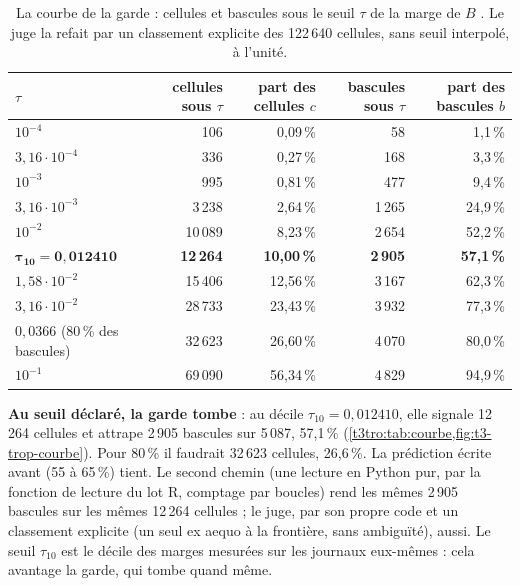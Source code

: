 \begin{table}[tbp]
\centering\small
\caption[La courbe de la garde]{La courbe de la garde : cellules et bascules sous le seuil $\tau$ de la marge de $B$ \mes. Le juge la refait par un classement explicite des 122\,640 cellules, sans seuil interpolé, à l'unité.}
\label{t3tro:tab:courbe}
\begin{tabular}{@{}lrrrr@{}}
\toprule
$\tau$ & cellules sous $\tau$ & part des cellules $c$ & bascules sous $\tau$ & part des bascules $b$ \\
\midrule
$10^{-4}$ & 106 & 0,09\,\% & 58 & 1,1\,\% \\
$3{,}16 \cdot 10^{-4}$ & 336 & 0,27\,\% & 168 & 3,3\,\% \\
$10^{-3}$ & 995 & 0,81\,\% & 477 & 9,4\,\% \\
$3{,}16 \cdot 10^{-3}$ & 3\,238 & 2,64\,\% & 1\,265 & 24,9\,\% \\
$10^{-2}$ & 10\,089 & 8,23\,\% & 2\,654 & 52,2\,\% \\
$\boldsymbol{\tau_{10} = 0{,}012410}$ & \textbf{12\,264} & \textbf{10,00\,\%} & \textbf{2\,905} & \textbf{57,1\,\%} \\
$1{,}58 \cdot 10^{-2}$ & 15\,406 & 12,56\,\% & 3\,167 & 62,3\,\% \\
$3{,}16 \cdot 10^{-2}$ & 28\,733 & 23,43\,\% & 3\,932 & 77,3\,\% \\
$0{,}0366$ (80\,\% des bascules) & 32\,623 & 26,60\,\% & 4\,070 & 80,0\,\% \\
$10^{-1}$ & 69\,090 & 56,34\,\% & 4\,829 & 94,9\,\% \\
\bottomrule
\end{tabular}
\end{table}

\textbf{Au seuil déclaré, la garde tombe} : au décile $\tau_{10} = 0{,}012410$, elle signale 12\,264 cellules et attrape 2\,905 bascules sur 5\,087, 57,1\,\% (\cref{t3tro:tab:courbe,fig:t3-trop-courbe}). Pour 80\,\% il faudrait 32\,623 cellules, 26,6\,\%. La prédiction écrite avant (55 à 65\,\%) tient. Le second chemin (une lecture en Python pur, par la fonction de lecture du lot R, comptage par boucles) rend les mêmes 2\,905 bascules sur les mêmes 12\,264 cellules ; le juge, par son propre code et un classement explicite (un seul ex aequo à la frontière, sans ambiguïté), aussi. Le seuil $\tau_{10}$ est le décile des marges mesurées sur les journaux eux-mêmes : cela avantage la garde, qui tombe quand même.

